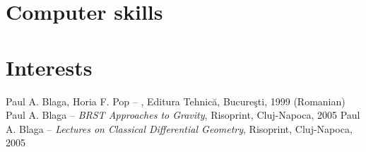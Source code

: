 \documentclass[11pt,a4paper]{moderncv}
\makeatletter
\renewcommand*{\bibliographyitemlabel}{\@biblabel{\arabic{enumiv}}}
\makeatother
\begin{document}
\section{Computer skills}

\section{Interests}

\begin{thebibliography}{9}
Paul A. Blaga, Horia F. Pop -- \emph{\LaTeXe}, Editura Tehnic\u{a}, Bucure\c{s}ti, 1999 (Romanian)
Paul A. Blaga -- \emph{BRST Approaches to Gravity}, Risoprint, Cluj-Napoca, 2005
Paul A. Blaga -- \emph{Lectures on Classical Differential Geometry}, Risoprint, Cluj-Napoca, 2005 
\end{thebibliography}
\end{document}
